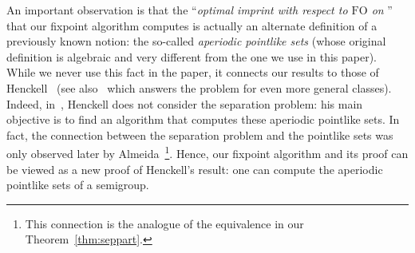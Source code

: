 \documentclass{CSML}
\newcommand{\fo}{\ensuremath{\text{FO}}\xspace}
\theoremstyle{plain}
\begin{document}
An important observation is that the ``\emph{optimal imprint with
respect to \fo on }'' that our fixpoint algorithm computes
is actually an alternate definition of a previously known notion:
the so-called \emph{aperiodic pointlike sets} (whose original definition is algebraic and very different from the
one we use in this paper). While we never use this fact in the paper,
it connects our results to those of
Henckell~\cite{Henckell:Pointlike-sets:-finest-aperiodic:1988:a} (see
also~\cite{DBLP:journals/ijac/HenckellRS10a,qt} which answers the problem for even more general classes). Indeed,
in~\cite{Henckell:Pointlike-sets:-finest-aperiodic:1988:a}, Henckell does not consider the separation problem: his main objective is to
find an algorithm that computes these aperiodic pointlike sets.
In fact, the connection between the separation
problem and the pointlike sets was only observed later
by Almeida~\cite{MR1709911}\footnote{This connection is the analogue of the equivalence
   in our
  Theorem~\ref{thm:seppart}.}. Hence, our fixpoint algorithm and its
proof can be viewed as a new proof of Henckell's result: one can
compute the aperiodic pointlike sets of a semigroup.
\end{document}
